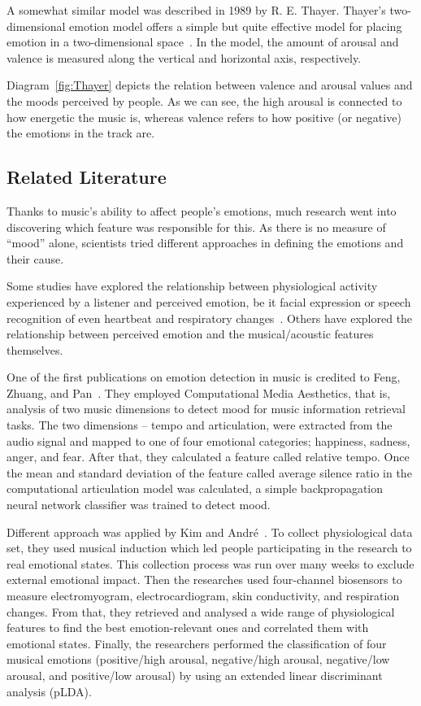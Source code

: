 A somewhat similar model was described in 1989 by R. E. Thayer. Thayer’s two-dimensional emotion model offers a simple but quite effective model for placing emotion in a two-dimensional space~\cite{Thayer}. In the model, the amount of arousal and valence is measured along the vertical and horizontal axis, respectively.

Diagram~\ref{fig:Thayer} depicts the relation between valence and arousal values and the moods perceived by people. As we can see, the high arousal is connected to how energetic the music is, whereas valence refers to how positive (or negative) the emotions in the track are. 

\vspace{10pt}

\subsection{Related Literature}

Thanks to music's ability to affect people's emotions, much research went into discovering which feature was responsible for this. As there is no measure of ``mood'' alone, scientists tried different approaches in defining the emotions and their cause.

Some studies have explored the relationship between physiological activity experienced by a listener and perceived emotion, be it facial expression or speech recognition of even heartbeat and respiratory changes~\cite{physicalmood}.
Others have explored the relationship between perceived emotion and the musical/acoustic features themselves.

One of the first publications on emotion detection in music is credited to Feng, Zhuang, and Pan~\cite{moodold}. They employed Computational Media Aesthetics, that is, analysis of two music dimensions to detect mood for music information retrieval tasks. The two dimensions -- tempo and articulation, were extracted from the audio signal and mapped to one of four emotional categories; happiness, sadness, anger, and fear. 
After that, they calculated a feature called relative tempo. Once the mean and standard deviation of the feature called average silence ratio in the computational articulation model was calculated, a simple backpropagation neural network classifier was trained to detect mood.

Different approach was applied by Kim and Andr\'{e}~\cite{physicalmood}. To collect physiological data set, they used musical induction which led people participating in the research to real emotional states. This collection process was run over many weeks to exclude external emotional impact. Then the researches used four-channel biosensors to measure electromyogram, electrocardiogram, skin conductivity, and respiration changes. From that, they retrieved and analysed a wide range of physiological features to find the best emotion-relevant ones and correlated them with emotional states. Finally, the researchers performed the classification of four musical emotions (positive/high arousal, negative/high arousal, negative/low arousal, and positive/low arousal) by using an extended linear discriminant analysis (pLDA).

